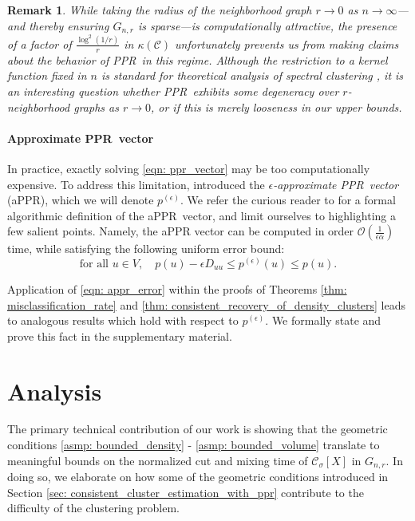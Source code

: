 \documentclass{article}
\newcommand{\1}{\mathbf{1}}
\newcommand{\pbf}{p}        %
\newcommand{\Xbf}{X}             %
\newcommand{\Dbf}{D}
\newcommand{\Cset}{\mathcal{C}}
\newcommand{\Csig}{\Cset_{\sigma}}
\newcommand{\pprspace}{{\sc PPR~}}
\theoremstyle{aldenthm}
\theoremstyle{aldenrmrk}
\newtheorem{remark}{Remark}
\begin{document}
\begin{remark}
	While taking the radius of the neighborhood graph $r \to 0$ as $n \to \infty$---and thereby ensuring $G_{n,r}$ is sparse---is computationally attractive, the presence of a factor of $\frac{\log^2(1/r)}{r}$ in $\kappa(\Cset)$ unfortunately prevents us from making claims about the behavior of \pprspace in this regime. Although the restriction to a kernel function fixed in $n$ is standard for theoretical analysis of spectral clustering \cite{schiebinger2015,vonluxburg2008}, it is an interesting question whether \pprspace exhibits some degeneracy over $r$-neighborhood graphs as $r \to 0$, or if this is merely looseness in our upper bounds.
\end{remark}

\paragraph{Approximate \pprspace vector}

In practice, exactly solving \eqref{eqn: ppr_vector} may be too computationally expensive. To address this limitation, \citet{andersen2006} introduced the \emph{$\epsilon$-approximate \pprspace vector} (aPPR), which we will denote $\pbf^{(\epsilon)}$. We refer the curious reader to \cite{andersen2006} for a formal algorithmic definition of the a\pprspace vector, and limit ourselves to highlighting a few salient points. Namely, the aPPR vector can be computed in  order $\mathcal{O}\left(\frac{1}{\epsilon \alpha}\right)$ time, while satisfying the following uniform error bound:
\begin{equation}
\label{eqn: appr_error}
\textrm{for all $u \in V$}, \quad \pbf(u) - \epsilon \Dbf_{uu}\leq \pbf^{(\epsilon)}(u) \leq \pbf(u). 
\end{equation}

Application of \eqref{eqn: appr_error} within the proofs of Theorems \ref{thm: misclassification_rate} and \ref{thm: consistent_recovery_of_density_clusters} leads to analogous results which hold with respect to $\pbf^{(\epsilon)}$. We formally state and prove this fact in the supplementary material.

\section{Analysis}
\label{sec: analysis}

The primary technical contribution of our work is showing that the geometric conditions \ref{asmp: bounded_density} - \ref{asmp: bounded_volume} translate to meaningful bounds on the normalized cut and mixing time of $\Csig[\Xbf]$ in $G_{n,r}$. In doing so, we elaborate on how some of the geometric conditions introduced in Section \ref{sec: consistent_cluster_estimation_with_ppr} contribute to the difficulty of the clustering problem.
\end{document}
